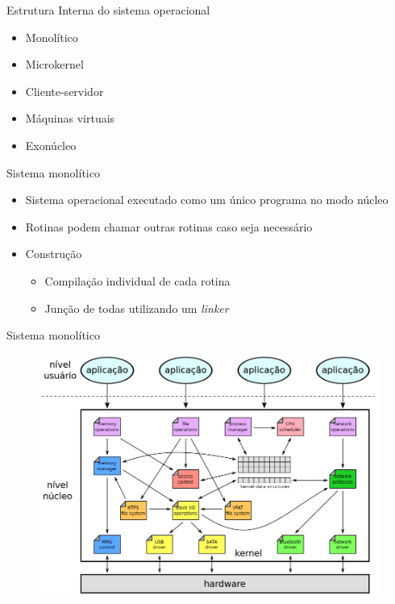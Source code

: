\documentclass[aspectratio=169,
				xcolor=table]{beamer}
\begin{document}
	\begin{frame}{Estrutura Interna do sistema operacional}
	\begin{itemize}
		\item Monolítico
		\item Microkernel
		\item Cliente-servidor
		\item Máquinas virtuais
		\item Exonúcleo
	\end{itemize}
	\end{frame}
	
	\begin{frame}{Sistema monolítico}	
		\begin{itemize}
			\item Sistema operacional executado como um único programa no modo núcleo
			\vspace{1em}
			\item Rotinas podem chamar outras rotinas caso seja necessário
			\vspace{1em}
			\item Construção
			\begin{itemize}
				\item Compilação individual de cada rotina
				\item Junção de todas utilizando um \textit{linker}
			\end{itemize}
		\end{itemize}
	\end{frame}

	\begin{frame}{Sistema monolítico}
		\begin{figure}[hbtp]
			\centering
			\includegraphics[width=.95\textheight, keepaspectratio]{../figs/cap01/monolitico}
		\end{figure}
	\end{frame}
	
\end{document}
